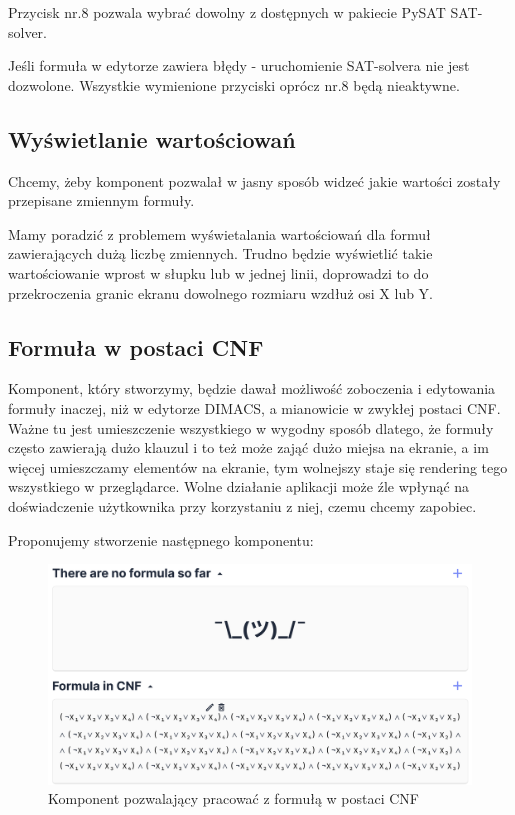 \documentclass[a4paper,12pt,oneside]{book}
\theoremstyle{definition}
\begin{document}
Przycisk nr.8 pozwala wybrać dowolny z dostępnych w pakiecie PySAT SAT-solver.

Jeśli formuła w edytorze zawiera błędy - uruchomienie SAT-solvera nie jest dozwolone. Wszystkie wymienione przyciski oprócz nr.8 będą nieaktywne.

\subsection{Wyświetlanie wartościowań}

Chcemy, żeby komponent pozwalał w jasny sposób widzeć jakie wartości zostały przepisane zmiennym formuły.

Mamy poradzić z problemem wyświetalania wartościowań dla formuł zawierających dużą liczbę zmiennych. Trudno będzie wyświetlić takie wartościowanie wprost w słupku lub w jednej linii, doprowadzi to do przekroczenia granic ekranu dowolnego rozmiaru wzdłuż osi X lub Y. 


\subsection{Formuła w postaci CNF}

Komponent, który stworzymy, będzie dawał możliwość zoboczenia i edytowania formuły inaczej, niż w edytorze DIMACS, a mianowicie w zwykłej postaci CNF. Ważne tu jest umieszczenie wszystkiego w wygodny sposób dlatego, że formuły często zawierają dużo klauzul i to też może zająć dużo miejsa na ekranie, a im więcej umieszczamy elementów na ekranie, tym wolnejszy staje się rendering tego wszystkiego w przeglądarce. Wolne działanie aplikacji może źle wpłynąć na doświadczenie użytkownika przy korzystaniu z niej, czemu chcemy zapobiec.

Proponujemy stworzenie następnego komponentu:

\begin{figure}[ht]
    \centering
    \includegraphics[width=14.30cm]{9}
    \caption{Komponent pozwalający pracować z formułą w postaci CNF}
    \label{fig:9}
\end{figure}
\end{document}
